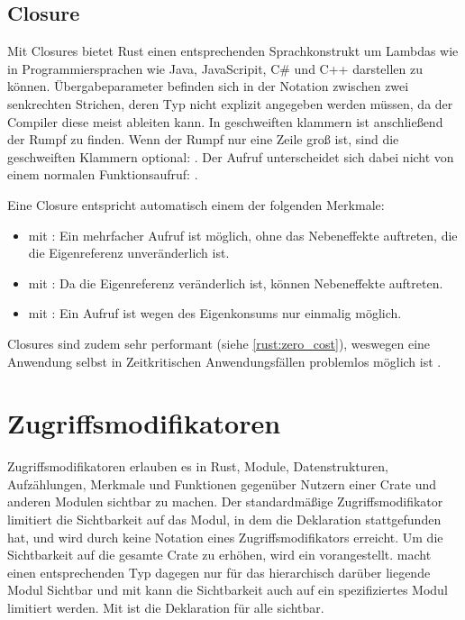 \subsection{Closure}
\label{rust:closures}

Mit Closures bietet Rust einen entsprechenden Sprachkonstrukt um Lambdas wie in Programmiersprachen wie Java, JavaScripit, C\# und C++ darstellen zu können.
Übergabeparameter befinden sich in der Notation zwischen zwei senkrechten Strichen, deren Typ nicht explizit angegeben werden müssen, da der Compiler diese meist ableiten kann.
In geschweiften klammern ist anschließend der Rumpf zu finden.
Wenn der Rumpf nur eine Zeile groß ist, sind die geschweiften Klammern optional: .
Der Aufruf unterscheidet sich dabei nicht von einem normalen Funktionsaufruf: .

Eine Closure entspricht automatisch einem der folgenden Merkmale:
\begin{itemize}
	\item {} mit : Ein mehrfacher Aufruf ist möglich, ohne das Nebeneffekte auftreten, die die Eigenreferenz unveränderlich ist.
	\item {} mit : Da die Eigenreferenz veränderlich ist, können Nebeneffekte auftreten.
	\item {} mit : Ein Aufruf ist wegen des Eigenkonsums nur einmalig möglich.
\end{itemize}

Closures sind zudem sehr performant (siehe \autoref{rust:zero_cost}), weswegen eine Anwendung selbst in Zeitkritischen Anwendungsfällen problemlos möglich ist \cite[310]{rust:orly_programming}.



\section{Zugriffsmodifikatoren}
\label{rust:access_modifier}

Zugriffsmodifikatoren erlauben es in Rust, Module, Datenstrukturen, Aufzählungen, Merkmale und Funktionen gegenüber Nutzern einer Crate und anderen Modulen sichtbar zu machen.
Der standardmäßige Zugriffsmodifikator limitiert die Sichtbarkeit auf das Modul, in dem die Deklaration stattgefunden hat, und wird durch keine Notation eines Zugriffsmodifikators erreicht.
Um die Sichtbarkeit auf die gesamte Crate zu erhöhen, wird ein  vorangestellt.
  macht einen entsprechenden Typ dagegen nur für das hierarchisch darüber liegende Modul Sichtbar und mit  kann die Sichtbarkeit auch auf ein spezifiziertes Modul limitiert werden.
Mit  ist die Deklaration für alle sichtbar.


